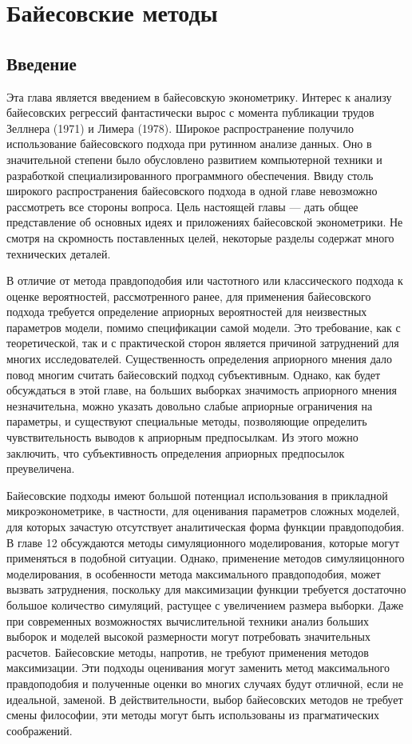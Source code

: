 
\chapter {Байесовские методы}


\section{Введение}

Эта глава является введением в байесовскую эконометрику. Интерес к анализу байесовских регрессий фантастически вырос с момента публикации трудов Зеллнера (1971) и Лимера (1978). Широкое распространение получило использование байесовского подхода при рутинном анализе данных.  Оно в значительной степени было обусловлено развитием компьютерной техники и разработкой специализированного программного обеспечения. Ввиду столь широкого распространения байесовского  подхода в одной главе невозможно рассмотреть все стороны вопроса. Цель настоящей главы --- дать общее представление об основных идеях и приложениях байесовской эконометрики. Не смотря на скромность поставленных целей, некоторые разделы содержат много технических деталей. 

В отличие от метода правдоподобия или частотного или классического подхода к оценке вероятностей, рассмотренного ранее, для применения байесовского подхода требуется определение априорных вероятностей для неизвестных параметров модели, помимо спецификации самой модели. Это требование, как с теоретической, так и с практической сторон является причиной затруднений для многих исследователей. Существенность определения априорного мнения дало повод многим считать байесовский подход субъективным. Однако, как будет обсуждаться в этой главе, на больших выборках значимость априорного мнения незначительна, можно указать довольно слабые априорные ограничения на параметры, и существуют специальные методы, позволяющие  определить чувствительность выводов к априорным предпосылкам. Из этого можно заключить, что субъективность определения априорных предпосылок преувеличена.

Байесовские подходы имеют большой потенциал использования в прикладной микроэконометрике, в частности, для оценивания параметров сложных моделей, для которых зачастую отсутствует аналитическая форма функции правдоподобия. В главе 12 обсуждаются методы симуляционного моделирования, которые могут применяться в подобной ситуации. Однако, применение методов  симуляицонного моделирования, в особенности метода максимального правдоподобия, может вызвать затруднения, поскольку для максимизации функции требуется достаточно большое количество симуляций, растущее с увеличением размера выборки. Даже при современных возможностях вычислительной техники анализ больших выборок и моделей высокой размерности могут потребовать значительных расчетов. Байесовские методы, напротив, не требуют применения методов максимизации. Эти подходы оценивания могут заменить метод максимального правдоподобия и полученные оценки во многих случаях будут отличной, если не идеальной, заменой. В действительности, выбор байесовских методов не требует смены философии, эти методы могут быть использованы из прагматических соображений.

